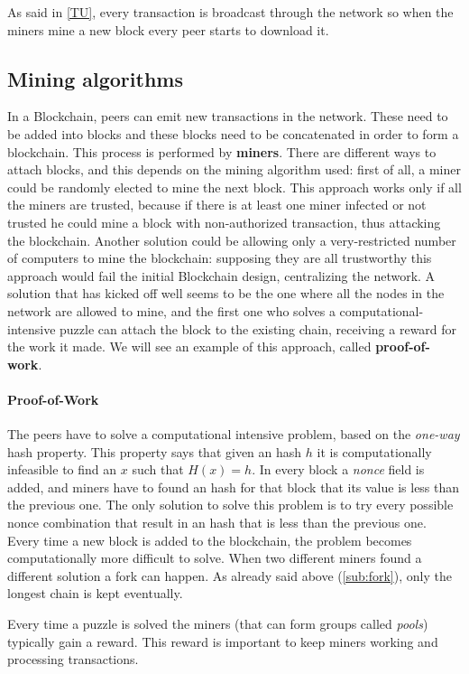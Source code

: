 As said in \ref{TU}, every transaction is broadcast through the network so when
the miners mine a new block every peer starts to download it.

\subsection{Mining algorithms}
In a Blockchain, peers can emit new transactions in the network. These
need to be added into blocks and these blocks need to be concatenated in order
to form a blockchain. This process is performed by \textbf{miners}.
There are different ways to attach blocks, and this depends on the mining
algorithm used: first of all, a miner could be randomly elected to mine the
next block. This approach works only if all the miners are trusted, because if
there is at least one miner infected or not trusted he could mine a block with
non-authorized transaction, thus attacking the blockchain. Another solution
could be allowing only a very-restricted number of computers to mine the
blockchain: supposing they are all trustworthy this approach would fail the
initial Blockchain design, centralizing the network.
A solution that has kicked off well seems to be the one where all the nodes in
the network are allowed to mine, and the first one who solves a
computational-intensive puzzle can attach the block to the existing chain,
receiving a reward for the work it made. We will see an example of this
approach, called \textbf{proof-of-work}.


\paragraph{Proof-of-Work}

The peers have to solve a computational intensive problem, based on the
\textit{one-way} hash property. This property says that given an hash $h$ it is
computationally infeasible to find an $x$ such that $H(x) = h$.
In every block a \textit{nonce} field is added, and miners have to found an
hash for that block that its value is less than the previous one\cite{sok15}.
The only solution to solve this problem is to try every possible nonce
combination that result in an hash that is less than the previous one. Every
time a new block is added to the blockchain, the problem becomes
computationally more difficult to solve.
When two different miners found a different solution a fork can happen. As
already said above (\ref{sub:fork}), only the longest chain is kept eventually.

Every time a puzzle is solved the miners (that can form groups called
\textit{pools}) typically gain a reward. This reward is important to keep miners
working and processing transactions.

